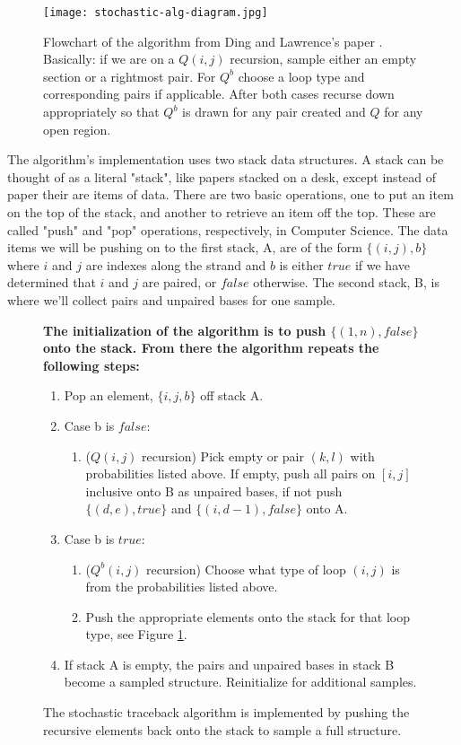 \begin{figure}
\centering
\texttt{[image: stochastic-alg-diagram.jpg]}
\caption[Stochastic Traceback Flowchart]{Flowchart of the algorithm from Ding and Lawrence's paper
  \cite{ding2003statistical}. Basically: if we are on a $Q(i,j)$
  recursion, sample either an empty section or a rightmost pair. For
  $Q^b$ choose a loop type and corresponding pairs if
  applicable. After both cases recurse down appropriately so that
  $Q^b$ is drawn for any pair created and $Q$ for any open region.}
\label{fig:stoch-flowchart}
\end{figure}

The algorithm's implementation uses two stack data structures. A stack
can be thought of as a literal "stack", like papers stacked on a desk,
except instead of paper their are items of data. There are two basic
operations, one to put an item on the top of the stack, and another to
retrieve an item off the top. These are called "push" and "pop"
operations, respectively, in Computer Science. The data items we will
be pushing on to the first stack, A, are of the form $\{(i,j), b\}$
where $i$ and $j$ are indexes along the strand and $b$ is either
$true$ if we have determined that $i$ and $j$ are paired, or $false$
otherwise. The second stack, B, is where we'll collect pairs and
unpaired bases for one sample.

\begin{figure}[t]
\bfseries\small
The initialization of the algorithm is to push $\{(1, n), false\}$
onto the stack. From there the algorithm repeats the following steps:
\begin{enumerate}
\item Pop an element, $\{i, j, b\}$ off stack A.
\item Case b is $false$:
\begin{enumerate}
\item ($Q(i,j)$ recursion) Pick empty or pair $(k,l)$ with
  probabilities listed above. If empty, push all pairs on $[i, j]$
  inclusive onto B as unpaired bases, if not push $\{(d, e), true\}$
  and $\{(i, d-1), false\}$ onto A.
\end{enumerate}
\item Case b is $true$:
\begin{enumerate}
\item ($Q^b(i,j)$ recursion) Choose what type of loop $(i,j)$ is from
  the probabilities listed above.
\item Push the appropriate elements onto the stack for that loop type,
  see Figure \ref{fig:stoch-flowchart}.
\end{enumerate}
\item If stack A is empty, the pairs and unpaired bases in stack B
  become a sampled structure. Reinitialize for additional samples.
\end{enumerate}
\caption[Stochastic Traceback Pseudocode]{The stochastic traceback
  algorithm is implemented by pushing the recursive elements back onto
  the stack to sample a full structure. }
\label{fig:stochastic-pseudocode}
\end{figure}

